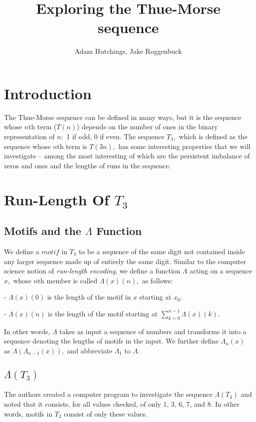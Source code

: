 \documentclass{article}
\begin{document}
\title{Exploring the Thue-Morse sequence}
\author{Adam Hutchings, Jake Roggenbuck}
\maketitle

\section{Introduction}
The Thue-Morse sequence can be defined in many ways, but it is the sequence whose $n$th term ($T(n)$) depends on the number of ones in the binary representation of $n:$ 1 if odd, 0 if even. The sequence $T_3,$ which is defined as the sequence whose $n$th term is $T(3n),$ has some interesting properties that we will investigate -- among the most interesting of which are the persistent imbalance of zeros and ones and the lengths of runs in the sequence.

\section{Run-Length Of $T_3$}

\subsection{Motifs and the $\Lambda$ Function}
We define a $motif$ in $T_3$ to be a sequence of the same digit not contained inside any larger sequence made up of entirely the same digit. Similar to the computer science notion of \emph{run-length encoding}, we define a function $\Lambda$ acting on a sequence $x,$ whose $n$th member is called $\Lambda(x)(n),$ as follows:

- $\Lambda(x)(0)$ is the length of the motif in $x$ starting at $x_0$.

- $\Lambda(x)(n)$ is the length of the motif starting at $\sum_{k=0}^{n-1} \Lambda(x)(k).$

In other words, $\Lambda$ takes as input a sequence of numbers and transforms it into a sequence denoting the lengths of motifs in the input. We further define $\Lambda_n(x)$ as $\Lambda(\Lambda_{n-1}(x)),$ and abbreviate $\Lambda_1$ to $\Lambda$.

\subsection{$\Lambda(T_3)$}

The authors created a computer program to investigate the sequence $\Lambda(T_3)$ and noted that it consists, for all values checked, of only 1, 3, 6, 7, and 8. In other words, motifs in $T_3$ consist of only these values.
\end{document}
